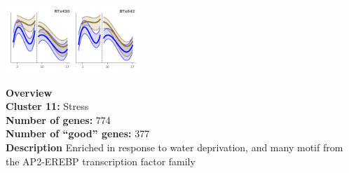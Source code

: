 \begin{multicols}{2}
\includegraphics[width=2in]{figures/clusters/root_Preflowering_10.png}
\columnbreak

\noindent \textbf{Overview}\\\textbf{Cluster 11:} Stress \\
\textbf{Number of genes:} 774 \\
\textbf{Number of ``good'' genes:} 377 \\
\textbf{Description} Enriched in response to water deprivation, and many motif from the AP2-EREBP transcription factor family \\
\end{multicols}

